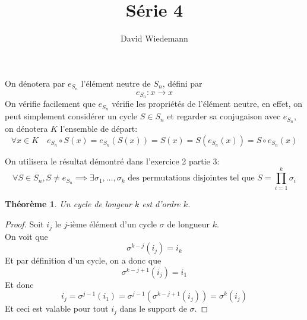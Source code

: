 \documentclass[11pt, a4paper]{article}
\newtheorem{theorem}{Théorème}
\begin{document}
\title{Série 4}
\author{David Wiedemann}
\maketitle
On dénotera par $e_{S_n} $ l'élément neutre de $S_n$, défini par
\[ 
	e_{S_n}:x \to x	
\]
On vérifie facilement que $e_{S_n} $ vérifie les propriétés de l'élément neutre, en effet, on peut simplement considérer un cycle $S \in S_n$ et regarder sa conjugaison avec $e_{S_n}$, on dénotera $K$ l'ensemble de départ: 
\[ 
	\forall x \in K \quad e_{S_n} \circ S ( x) = e_{S_n}(S(x)) = S(x) = S(e_{S_n} ( x)) = S \circ e_{S_n} ( x)
\]

On utilisera le résultat démontré dans l'exercice 2 partie 3:
\[ 
	\forall S \in S_n, S \neq e_{S_n}  \implies \exists \sigma_1,\ldots,\sigma_k \text{ des permutations disjointes tel que } S = \prod_{i=1} ^{k} \sigma_i
\]

\begin{theorem}
Un cycle de longeur $k$ est d'ordre $k$.
\end{theorem}
\begin{proof}
 	Soit $i_j$ le $j$-ième élément d'un cycle $\sigma$ de longueur $k$.\\
	On voit que
	\[ 
	\sigma^{k-j} ( i_j ) = i_k
	\]
	Et par définition d'un cycle, on a donc que 
	\[ 
	\sigma^{k-j+1}(  i_j  )= i_1
	\]
	Et donc 
	\[ 
	i_j =\sigma^{j-1} ( i_1 ) = \sigma^{j-1} ( \sigma^{k-j+1} ( i_j ) ) = \sigma^{k} ( i_j )
	\]
	Et ceci est valable pour tout $i_j$ dans le support de $\sigma$.	
\end{proof}
\end{document}
